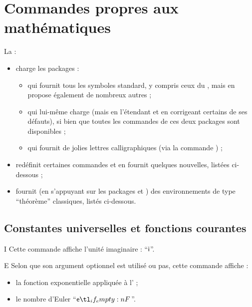 \section{Commandes propres aux mathématiques}
\label{sec:comm-propr-aux}

La \nwejmauthorcl{} :
\begin{itemize}
\item charge les packages :
  \begin{itemize}
  \item {} qui fournit tous les symboles standard, y compris
    ceux du , mais en propose également de nombreux autres ;
  \item {} qui lui-même charge  (mais en
    l'étendant et en corrigeant certains de ses défauts), si bien que toutes les
    commandes de ces deux packages sont disponibles ;
  \item {} qui fournit de jolies lettres calligraphiques (via
    la commande ) ;
  \end{itemize}
\item redéfinit certaines commandes et en fournit quelques nouvelles, listées
  ci-dessous ;
\item fournit (en s'appuyant sur les packages  et
  ) des environnements de type \enquote{théorème} classiques,
  listés ci-dessous.
\end{itemize}

\subsection{Constantes universelles et fonctions courantes}

\begin{docCommand}{I}{}
  Cette commande affiche l'unité imaginaire : \enquote{$\mathsf{i}$}.
\end{docCommand}

\begin{docCommand}{E}{}
 Selon que son argument optionnel est utilisé ou pas, cette commande affiche :
  \begin{itemize}
  \item la fonction exponentielle appliquée à l' ;
  \item le nombre d'Euler \enquote{$\E$}.
  \end{itemize}
\end{docCommand}

